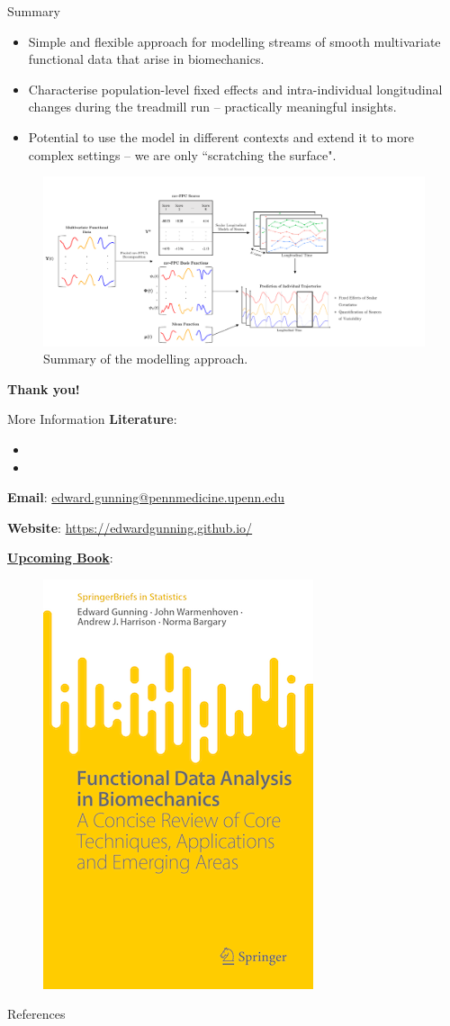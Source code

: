 \documentclass[aspectratio=128,xcolor=dvipsnames, notes]{beamer}
\newcommand{\1}{\mathbf{1}}
\begin{document}
\begin{frame}{Summary}
\begin{itemize}
    \pause \item Simple and flexible approach for modelling streams of smooth multivariate functional data that arise in biomechanics.
    \pause \item Characterise population-level fixed effects and intra-individual longitudinal changes during the treadmill run -- practically meaningful insights.
    \pause \item Potential to use the model in different contexts and extend it to more complex settings -- we are only ``scratching the surface".
\end{itemize}
\begin{figure}
    \centering
    \includegraphics[width=0.65\linewidth]{methods-schematic.pdf}
    \caption{Summary of the modelling approach.}
    \label{fig:enter-label}
\end{figure}
\end{frame}

\begin{frame}
    \vfill
    \Huge{\centerline{\textbf{Thank you!}}}
    \vfill
\end{frame}




\begin{frame}{More Information}
\small
   \textbf{Literature}:
   \begin{itemize}
       \item {}
       \item {}
   \end{itemize}
\textbf{Email}: \href{mailto:edward.gunning@pennmedicine.upenn.edu}{edward.gunning@pennmedicine.upenn.edu}


\textbf{Website}: \url{https://edwardgunning.github.io/}   
   
\textbf{\href{https://link.springer.com/book/9783031688614}{Upcoming Book}}:
   \begin{figure}
       \centering
       \includegraphics[width=0.175\linewidth]{figures/book_frontcover.png}
       \label{fig:enter-label}
   \end{figure}
\end{frame}

\begin{frame}{References}
       \printbibliography
\end{frame}
\end{document}
